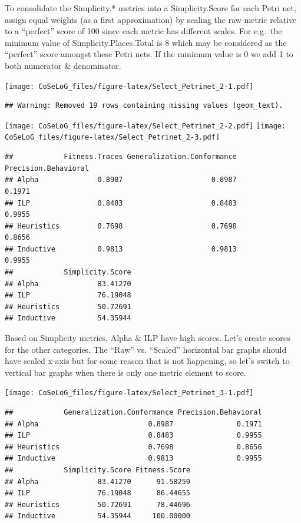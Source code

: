 \documentclass[]{article}
\begin{document}
To consolidate the Simplicity.* metrics into a Simplicity.Score for each
Petri net, assign equal weights (as a first approximation) by scaling
the raw metric relative to a ``perfect'' score of 100 since each metric
has different scales. For e.g.~the minimum value of
Simplicity.Places.Total is 8 which may be considered as the ``perfect''
score amongst these Petri nets. If the minimum value is 0 we add 1 to
both numerator \& denominator.

\texttt{[image: CoSeLoG\_files/figure-latex/Select\_Petrinet\_2-1.pdf]}

\begin{verbatim}
## Warning: Removed 19 rows containing missing values (geom_text).
\end{verbatim}

\texttt{[image: CoSeLoG\_files/figure-latex/Select\_Petrinet\_2-2.pdf]}
\texttt{[image: CoSeLoG\_files/figure-latex/Select\_Petrinet\_2-3.pdf]}

\begin{verbatim}
##            Fitness.Traces Generalization.Conformance Precision.Behavioral
## Alpha              0.8987                     0.8987               0.1971
## ILP                0.8483                     0.8483               0.9955
## Heuristics         0.7698                     0.7698               0.8656
## Inductive          0.9813                     0.9813               0.9955
##            Simplicity.Score
## Alpha              83.41270
## ILP                76.19048
## Heuristics         50.72691
## Inductive          54.35944
\end{verbatim}

Based on Simplicity metrics, Alpha \& ILP have high scores. Let's create
scores for the other categories. The ``Raw'' vs. ``Scaled'' horizontal
bar graphs should have scaled x-axis but for some reason that is not
happening, so let's switch to vertical bar graphs when there is only one
metric element to score.

\texttt{[image: CoSeLoG\_files/figure-latex/Select\_Petrinet\_3-1.pdf]}

\begin{verbatim}
##            Generalization.Conformance Precision.Behavioral
## Alpha                          0.8987               0.1971
## ILP                            0.8483               0.9955
## Heuristics                     0.7698               0.8656
## Inductive                      0.9813               0.9955
##            Simplicity.Score Fitness.Score
## Alpha              83.41270      91.58259
## ILP                76.19048      86.44655
## Heuristics         50.72691      78.44696
## Inductive          54.35944     100.00000
\end{verbatim}
\end{document}
